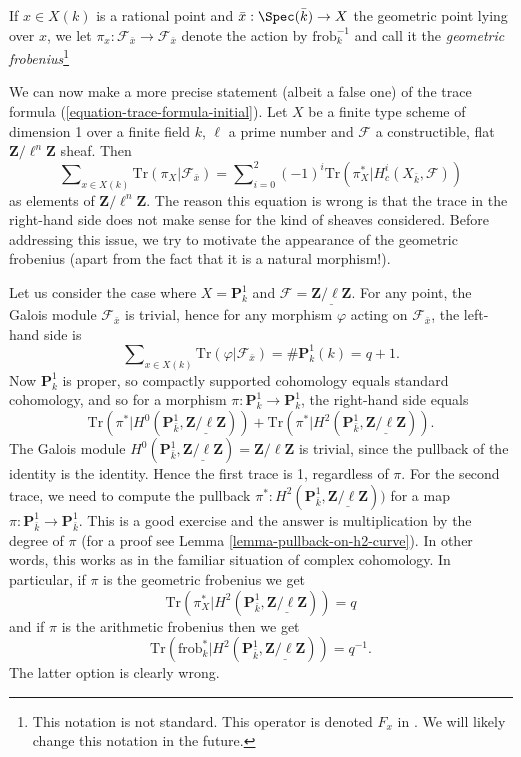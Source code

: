 \begin{definition}
\label{definition-geometric-frobenius-on-stalk}
If $x \in X(k)$ is a rational point and $\bar x : \Spec(\bar k) \to X$
the geometric point lying over $x$, we let $\pi_x : \mathcal{F}_{\bar x} \to
\mathcal{F}_{\bar x}$ denote the action by $\text{frob}_k^{-1}$ and call it the
{\it geometric frobenius}\footnote{This notation is not standard.
This operator is denoted $F_x$ in \cite{SGA4.5}. We will likely change
this notation in the future.}
\end{definition}

\noindent
We can now make a more precise statement (albeit a false one) of the trace
formula (\ref{equation-trace-formula-initial}). Let $X$ be a finite
type scheme of dimension 1
over a finite field $k$, $\ell$ a prime number and $\mathcal{F}$ a
constructible, flat $\mathbf{Z}/\ell^n\mathbf{Z}$ sheaf. Then
\begin{equation}
\label{equation-trace-formula-second}
\sum\nolimits_{x \in X(k)}
\text{Tr}(\pi_X | \mathcal{F}_{\bar x})
=
\sum\nolimits_{i = 0}^2
(-1)^i \text{Tr}(\pi_X^* | H^i_c(X_{\bar k}, \mathcal{F}))
\end{equation}
as elements of $\mathbf{Z}/\ell^n\mathbf{Z}$. The reason this equation is wrong
is that the trace in the right-hand side does not make sense for the kind of
sheaves considered. Before addressing this issue, we try to motivate the
appearance of the geometric frobenius (apart from the fact that it is a natural
morphism!).

\medskip\noindent
Let us consider the case where $X = \mathbf{P}^1_k$ and $\mathcal{F} =
\underline{\mathbf{Z}/\ell\mathbf{Z}}$. For any point, the Galois module
$\mathcal{F}_{\bar x}$ is trivial, hence for any morphism $\varphi$ acting on
$\mathcal{F}_{\bar x}$, the left-hand side is
$$
\sum\nolimits_{x \in X(k)} \text{Tr}(\varphi | \mathcal{F}_{\bar x}) =
\#\mathbf{P}^1_k(k) = q+1.
$$
Now $\mathbf{P}^1_k$ is proper, so compactly supported cohomology equals
standard cohomology, and so for a morphism $\pi : \mathbf{P}^1_k \to
\mathbf{P}^1_k$, the right-hand side equals
$$
\text{Tr}(\pi^* | H^0 (\mathbf{P}^1_{\bar k},
\underline{\mathbf{Z}/\ell\mathbf{Z}})) + \text{Tr}(\pi^* | H^2
(\mathbf{P}^1_{\bar k}, \underline{\mathbf{Z}/\ell\mathbf{Z}})).
$$
The Galois module $H^0 (\mathbf{P}^1_{\bar k},
\underline{\mathbf{Z}/\ell\mathbf{Z}}) = \mathbf{Z}/\ell\mathbf{Z}$ is trivial,
since the pullback of the identity is the identity. Hence the first trace is 1,
regardless of $\pi$. For the second trace, we need to compute the pullback
$\pi^* : H^2(\mathbf{P}^1_{\bar k}, \underline{\mathbf{Z}/\ell\mathbf{Z}}))$
for a map $\pi : \mathbf{P}^1_{\bar k} \to \mathbf{P}^1_{\bar k}$. This is a
good exercise and the answer is multiplication by the degree of $\pi$
(for a proof see Lemma \ref{lemma-pullback-on-h2-curve}). In other
words, this works as in the familiar situation of complex cohomology. In
particular, if $\pi$ is the geometric frobenius we get
$$
\text{Tr}(\pi_X^* | H^2 (\mathbf{P}^1_{\bar k},
\underline{\mathbf{Z}/\ell\mathbf{Z}})) = q
$$
and if $\pi$ is the arithmetic frobenius then we get
$$
\text{Tr}(\text{frob}_k^* | H^2 (\mathbf{P}^1_{\bar k},
\underline{\mathbf{Z}/\ell\mathbf{Z}})) = q^{-1}.
$$
The latter option is clearly wrong.

